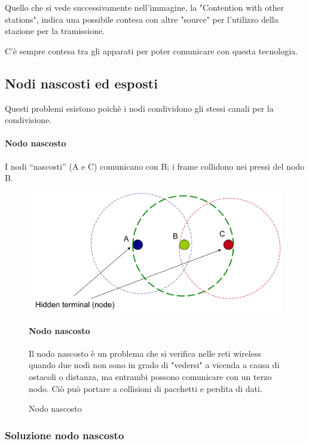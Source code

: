 Quello che si vede successivamente nell'immagine, la "Contention with other stations", indica una possibile contesa con altre "source" per l'utilizzo della stazione per la tramissione.

C'è sempre contesa tra gli apparati per poter comunicare con questa tecnologia. 

\newpage
\subsection{Nodi nascosti ed esposti}
Questi problemi esistono poichè i nodi condividono gli stessi canali per la condivisione.
\paragraph{Nodo nascosto}
I nodi “nascosti” (A e C) comunicano con B; i frame collidono nei pressi del nodo B.
\begin{figure}[h!]
    \centering
    \begin{minipage}{0.49\textwidth}
        \includegraphics[width=\linewidth]{images/nodonascosto.png}
    \end{minipage}
    \hfill
    \begin{minipage}{0.5\textwidth}
        \paragraph{Nodo nascosto}
        Il nodo nascosto è un problema che si verifica nelle reti wireless quando due nodi non sono in grado di "vedersi" a vicenda a causa di ostacoli o distanza, ma entrambi possono comunicare con un terzo nodo. Ciò può portare a collisioni di pacchetti e perdita di dati.
    \end{minipage}
    \caption{Nodo nascosto}
    \label{fig:nodo nascosto}
\end{figure}

\subsubsection{Soluzione nodo nascosto} 

